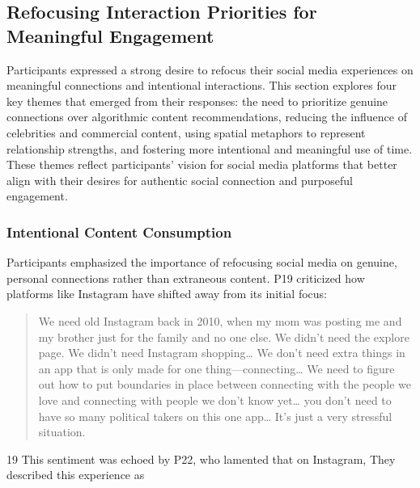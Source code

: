 \subsection{Refocusing Interaction Priorities for Meaningful Engagement}
\label{lab:4-5}
Participants expressed a strong desire to refocus their social media experiences on meaningful connections and intentional interactions. This section explores four key themes that emerged from their responses: the need to prioritize genuine connections over algorithmic content recommendations, reducing the influence of celebrities and commercial content, using spatial metaphors to represent relationship strengths, and fostering more intentional and meaningful use of time. These themes reflect participants' vision for social media platforms that better align with their desires for authentic social connection and purposeful engagement.

\subsubsection{Intentional Content Consumption}
\label{lab:4-5-1}
Participants emphasized the importance of refocusing social media on genuine, personal connections rather than extraneous content. P19 criticized how platforms like Instagram have shifted away from its initial focus: \blockquote{We need old Instagram back in 2010, when my mom was posting me and my brother just for the family and no one else. We didn't need the explore page. We didn't need Instagram shopping\ldots{} We don't need extra things in an app that is only made for one thing---connecting\ldots{} We need to figure out how to put boundaries in place between connecting with the people we love and connecting with people we don't know yet\ldots{} you don't need to have so many political takers on this one app\ldots{} It's just a very stressful situation.}{19} This sentiment was echoed by P22, who lamented that on Instagram,  They described this experience as  

